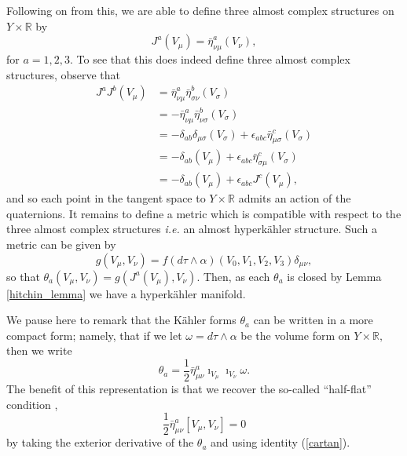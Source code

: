 \documentclass[a4paper,onecolumn,12pt]{article}
\theoremstyle{definition}
\theoremstyle{remark}
\newcommand{\ie}{\emph{i.e.} }
\newcommand{\al}{\alpha}
\newcommand{\m}{\mu}
\newcommand{\n}{\nu}
\newcommand{\tta}[1]{\theta_{#1}}
\newcommand{\K}{K\"ahler }
\newcommand{\HK}{hyperk\"ahler }
\newcommand{\R}{\mathbb{R}}
\newcommand{\hooft}[3]{\bar{\eta}^{#1}_{#2 #3}}
\begin{document}
Following on from this, we are able to define three almost complex structures on $Y\times\R$ by
\begin{equation}
	J^{a}(V_{\m}) = \hooft{a}{\n}{\m}(V_{\n}),
\end{equation}
for $a=1,2,3.$ To see that this does indeed define three almost complex structures, observe that
\begin{align*}
	J^{a}J^{b}(V_{\m}) &= \hooft{a}{\n}{\m}\hooft{b}{\sigma}{\n}(V_{\sigma})\\
	&=-\hooft{a}{\n}{\m}\hooft{b}{\n}{\sigma}(V_{\sigma})\\
	&=-\delta_{ab}\delta_{\m\sigma}(V_{\sigma}) + \epsilon_{abc}\bar{\eta}^{c}_{\m \sigma}(V_{\sigma})\\
	&=-\delta_{ab}(V_{\m}) + \epsilon_{abc}\bar{\eta}^{c}_{\sigma \m}(V_{\sigma})\\
	&=-\delta_{ab}(V_{\m}) + \epsilon_{abc}J^{c}(V_{\m}),
\end{align*}
and so each point in the tangent space to $Y\times\R$ admits an action of the quaternions.
It remains to define a metric which is compatible with respect to the three almost complex structures \ie an almost \HK structure. Such a metric can be given by 
\begin{equation}
	g(V_{\m},V_{\n}) = f(d\tau\wedge\al)(V_{0},V_{1},V_{2},V_{3})\delta_{\m\n},
\end{equation}
so that $\tta{a}(V_{\m},V_{\n}) = g(J^{a}(V_{\m}),V_{\n}).$ Then, as each $\tta{a}$ is closed by Lemma \ref{hitchin_lemma} we have a \HK manifold.

We pause here to remark that the \K forms $\tta{a}$ can be written in a more compact form; namely, that if we let $\omega = d\tau\wedge\alpha$ be the volume form on $Y\times\R,$ then we  write
\begin{equation}
	\tta{a} = \frac{1}{2}\hooft{a}{\m}{\n}\imath_{V_{\m}}\imath_{V_{\n}}\omega.
\end{equation}
The benefit of this representation is that we recover the so-called ``half-flat'' condition \cite{ashtekar_1988, hashimoto_1997}, 
\begin{equation}
\label{half_flat}
	\frac{1}{2}\hooft{a}{\m}{\n}[V_{\m},V_{\n}] = 0
\end{equation}
by taking the exterior derivative of the $\tta{a}$ and using identity (\ref{cartan}). 
\end{document}
